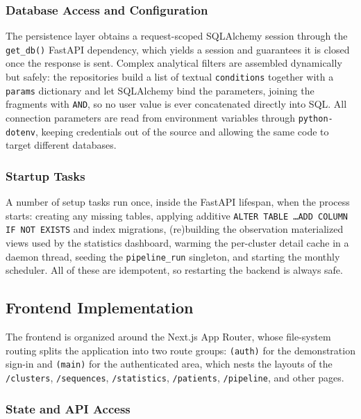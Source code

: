 \subsubsection*{Database Access and Configuration}

The persistence layer obtains a request-scoped SQLAlchemy session through the \texttt{get\_db()} FastAPI dependency, which yields a session and guarantees it is closed once the response is sent. Complex analytical filters are assembled dynamically but safely: the repositories build a list of textual \texttt{conditions} together with a \texttt{params} dictionary and let SQLAlchemy bind the parameters, joining the fragments with \texttt{AND}, so no user value is ever concatenated directly into SQL. All connection parameters are read from environment variables through \texttt{python-dotenv}, keeping credentials out of the source and allowing the same code to target different databases.

\subsubsection*{Startup Tasks}

A number of setup tasks run once, inside the FastAPI lifespan, when the process starts: creating any missing tables, applying additive \texttt{ALTER TABLE \dots ADD COLUMN IF NOT EXISTS} and index migrations, (re)building the observation materialized views used by the statistics dashboard, warming the per-cluster detail cache in a daemon thread, seeding the \texttt{pipeline\_run} singleton, and starting the monthly scheduler. All of these are idempotent, so restarting the backend is always safe.

\subsection{Frontend Implementation}
\label{ch:frontend_impl}

The frontend is organized around the Next.js App Router, whose file-system routing splits the application into two route groups: \texttt{(auth)} for the demonstration sign-in and \texttt{(main)} for the authenticated area, which nests the layouts of the \texttt{/clusters}, \texttt{/sequences}, \texttt{/statistics}, \texttt{/patients}, \texttt{/pipeline}, and other pages.

\subsubsection*{State and API Access}

